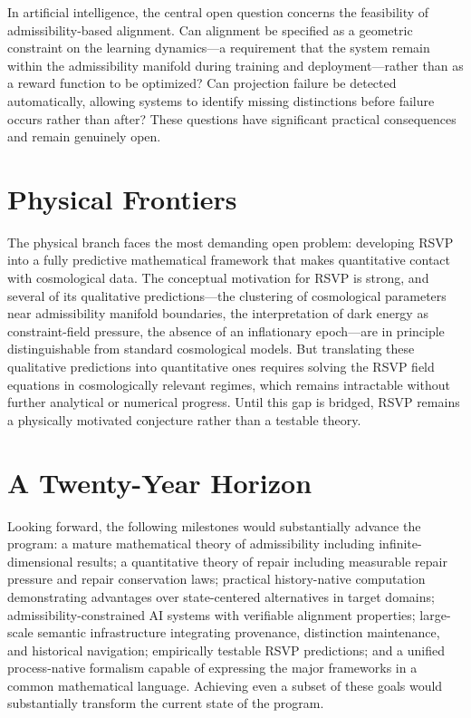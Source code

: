\documentclass[11pt, oneside]{book}
\theoremstyle{definition}
\theoremstyle{remark}
\begin{document}
In artificial intelligence, the central open question concerns the feasibility of admissibility-based alignment. Can alignment be specified as a geometric constraint on the learning dynamics—a requirement that the system remain within the admissibility manifold during training and deployment—rather than as a reward function to be optimized? Can projection failure be detected automatically, allowing systems to identify missing distinctions before failure occurs rather than after? These questions have significant practical consequences and remain genuinely open.

\section{Physical Frontiers}

The physical branch faces the most demanding open problem: developing RSVP into a fully predictive mathematical framework that makes quantitative contact with cosmological data. The conceptual motivation for RSVP is strong, and several of its qualitative predictions—the clustering of cosmological parameters near admissibility manifold boundaries, the interpretation of dark energy as constraint-field pressure, the absence of an inflationary epoch—are in principle distinguishable from standard cosmological models. But translating these qualitative predictions into quantitative ones requires solving the RSVP field equations in cosmologically relevant regimes, which remains intractable without further analytical or numerical progress. Until this gap is bridged, RSVP remains a physically motivated conjecture rather than a testable theory.

\section{A Twenty-Year Horizon}

Looking forward, the following milestones would substantially advance the program: a mature mathematical theory of admissibility including infinite-dimensional results; a quantitative theory of repair including measurable repair pressure and repair conservation laws; practical history-native computation demonstrating advantages over state-centered alternatives in target domains; admissibility-constrained AI systems with verifiable alignment properties; large-scale semantic infrastructure integrating provenance, distinction maintenance, and historical navigation; empirically testable RSVP predictions; and a unified process-native formalism capable of expressing the major frameworks in a common mathematical language. Achieving even a subset of these goals would substantially transform the current state of the program.
\end{document}
